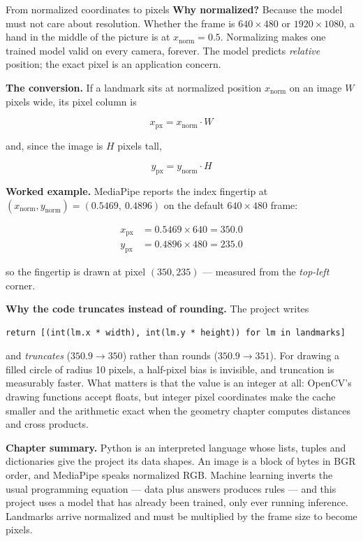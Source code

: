 \begin{mathdeepdive}{From normalized coordinates to pixels}
\textbf{Why normalized?} Because the model must not care about resolution. Whether the frame is
$640 \times 480$ or $1920 \times 1080$, a hand in the middle of the picture is at
$x_{\text{norm}} = 0.5$. Normalizing makes one trained model valid on every camera, forever. The
model predicts \emph{relative} position; the exact pixel is an application concern.

\textbf{The conversion.} If a landmark sits at normalized position $x_{\text{norm}}$ on an image
$W$ pixels wide, its pixel column is

$$x_{\text{px}} = x_{\text{norm}} \cdot W$$

and, since the image is $H$ pixels tall,

$$y_{\text{px}} = y_{\text{norm}} \cdot H$$

\textbf{Worked example.} MediaPipe reports the index fingertip at
$(x_{\text{norm}}, y_{\text{norm}}) = (0.5469,\ 0.4896)$ on the default $640 \times 480$ frame:

\begin{align*}
x_{\text{px}} &= 0.5469 \times 640 = 350.0 \\
y_{\text{px}} &= 0.4896 \times 480 = 235.0
\end{align*}

so the fingertip is drawn at pixel $(350, 235)$ --- measured from the \emph{top-left} corner.

\textbf{Why the code truncates instead of rounding.} The project writes

\begin{lstlisting}
return [(int(lm.x * width), int(lm.y * height)) for lm in landmarks]
\end{lstlisting}

and  \emph{truncates} ($350.9 \rightarrow 350$) rather than rounds
($350.9 \rightarrow 351$). For drawing a filled circle of radius 10 pixels, a half-pixel bias is
invisible, and truncation is measurably faster. What matters is that the value is an integer at all:
OpenCV's drawing functions accept floats, but integer pixel coordinates make the cache smaller and
the arithmetic exact when the geometry chapter computes distances and cross products.
\end{mathdeepdive}

\begin{keyidea}
\textbf{Chapter summary.} Python is an interpreted language whose lists, tuples and dictionaries give
the project its data shapes. An image is a  block of bytes in BGR order, and
MediaPipe speaks normalized RGB. Machine learning inverts the usual programming equation --- data
plus answers produces rules --- and this project uses a model that has already been trained, only
ever running inference. Landmarks arrive normalized and must be multiplied by the frame size to
become pixels.
\end{keyidea}
